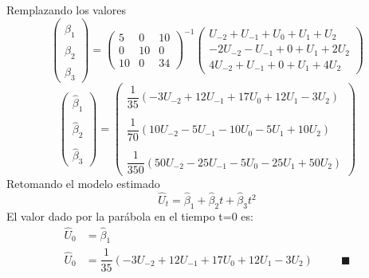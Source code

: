 \documentclass[10pt,a4paper, openany ]{book}
\begin{document}
  Remplazando los valores
  \begin{equation*}
  \begin{pmatrix}
  \hat{\beta}_{1} \\
    \hat{\beta}_{2}\\
  \hat{\beta}_{3}
  \end{pmatrix}  = 
  \begin{pmatrix}
  5 & 0 & 10  \\
  0 & 10 & 0 \\
  10 & 0 & 34
  \end{pmatrix}^{-1} 
  \begin{pmatrix}
  U_{-2} +U_{-1}+U_{0}+U_{1}+U_{2} \\
  -2U_{-2} -U_{-1}+0+U_{1}+2U_{2} \\
  4U_{-2} +U_{-1}+0+U_{1}+4U_{2}
  \end{pmatrix} 
  \end{equation*}
  \begin{equation*}
  \begin{pmatrix}
  \hat{\beta}_{1} 
  \\
  \\
    \hat{\beta}_{2}
    \\
    \\
  \hat{\beta}_{3}
  \end{pmatrix} = 
  \begin{pmatrix}
  \dfrac{1}{35}(-3U_{-2}+12U_{-1}+17U_{0}+12U_{1}-3U_{2})
  \\
  \\
  \dfrac{1}{70}(10U_{-2}-5U_{-1}-10U_{0}-5U_{1}+10U_{2})
  \\
  \\
  \dfrac{1}{350}(50U_{-2}-25U_{-1}-5U_{0}-25U_{1}+50U_{2})
  \end{pmatrix} 
  \end{equation*}
  Retomando el modelo estimado
  \begin{equation*}
      \hat{U}_{t} = \hat{\beta}_{1}+\hat{\beta}_{2}t+\hat{\beta}_{3}t^{2}
  \end{equation*}
  El valor dado por la parábola en el tiempo t=0 es: 
  \begin{align*}
      \hat{U}_{0} &= \hat{\beta}_{1} \\
        \hat{U}_{0} &= \dfrac{1}{35}(-3U_{-2}+12U_{-1}+17U_{0}+12U_{1}-3U_{2}) \, \, \, \, \, \,  \,  \, \,  \,  \, \,  \,  \, \, \blacksquare 
  \end{align*} 
\end{document}
